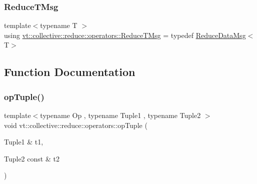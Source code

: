 \subsubsection{\texorpdfstring{Reduce\+T\+Msg}{ReduceTMsg}}
{\footnotesize\ttfamily template$<$typename T $>$ \\
using \hyperlink{namespacevt_1_1collective_1_1reduce_1_1operators_a85097552afc7e87d5d5092f068223ca0}{vt\+::collective\+::reduce\+::operators\+::\+Reduce\+T\+Msg} = typedef \hyperlink{structvt_1_1collective_1_1reduce_1_1operators_1_1_reduce_data_msg}{Reduce\+Data\+Msg}$<$T$>$}



\subsection{Function Documentation}
\mbox{\label{namespacevt_1_1collective_1_1reduce_1_1operators_a697c168f0d6b5016d4673b6120c04212}} 
\subsubsection{\texorpdfstring{op\+Tuple()}{opTuple()}}
{\footnotesize\ttfamily template$<$typename Op , typename Tuple1 , typename Tuple2 $>$ \\
void vt\+::collective\+::reduce\+::operators\+::op\+Tuple (\begin{DoxyParamCaption}\item[{Tuple1 \&}]{t1,  }\item[{Tuple2 const \&}]{t2 }\end{DoxyParamCaption})}

